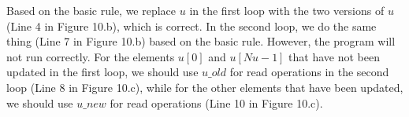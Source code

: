 Based on the basic rule, we replace $u$
in the first loop with the two versions of $u$ (Line 4 in Figure 10.b), which is correct.
In the second loop, 
we do the same thing (Line 7 in Figure 10.b) based on the basic rule. 
However, the program will not run correctly.
For the elements $u[0]$ and $u[Nu-1]$ that have not been updated in the first loop, we should use $u\_old$ for read operations in the second loop (Line 8 in Figure 10.c), while for the other elements that have been updated, we should use $u\_new$ for read operations (Line 10 in Figure 10.c). 

\begin{comment}
Fig~\ref{fig:inconsistent_update} (a)and(c) are  two inconsistent update cases. Fig~\ref{fig:inconsistent_update} (b)and(d) are potential dual version implementation of (a)and(c). The inconsistent state is marked as bold in figure. In Fig~\ref{fig:inconsistent_update}(a), when $i$= $1$ to $Nu/2$, $u_?$ should be replaced with $u_old$, but when $i$= $Nu/2+1$ to $Nu$, $u_?$ should be replaced with $u_new$. In Fig~\ref{fig:inconsistent_update}(c), $u$ experienced two update, while the first loop  make a partial update to $u$, the second loop accesses whole $u$. While When $i$= $2$ to $Nu-1$, $u_?$ should be replaced with $u_new$. But when $i$= $1$ or $Nu$, $u_?$ should be replaced with $u_{old}$.  The approach that we replace $u$ with $u_{old}$ or $u_{new}$ should be applied to every element of the array. But the individual element of array may have inconsistent state. Therefore, we need to make a consistent state check before we implement dual version. Only those data objects which pass consistent check could be implemented with dual versions, others will check-pointed with data copy. The overhead of doing consistence check could be extremely high since we will need to track the update status of every element in array. However, we observed that HPC benchmarks follow some similar update pattern, and 
we propose a light weight consistency check method which only track the update status of key elements. 
\end{comment}

